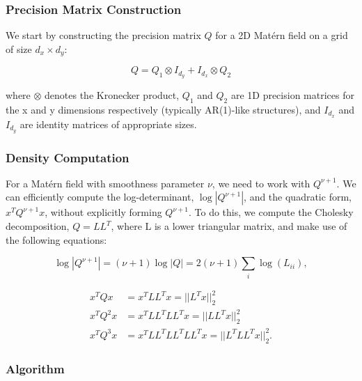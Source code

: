 \documentclass[
  12pt]{article}
\begin{document}
\subsubsection{Precision Matrix
Construction}\label{precision-matrix-construction}

We start by constructing the precision matrix \(Q\) for a 2D Matérn
field on a grid of size \(d_x \times d_y\):

\[
Q = Q_1 \otimes I_{d_y} + I_{d_x} \otimes Q_2 
\]

where \(\otimes\) denotes the Kronecker product, \(Q_1\) and \(Q_2\) are
1D precision matrices for the x and y dimensions respectively (typically
AR(1)-like structures), and \(I_{d_x}\) and \(I_{d_y}\) are identity
matrices of appropriate sizes.

\subsubsection{Density Computation}\label{density-computation}

For a Matérn field with smoothness parameter \(\nu\), we need to work
with \(Q^{\nu+1}\). We can efficiently compute the log-determinant,
\(\log|Q^{\nu+1}|\), and the quadratic form, \(x^T Q^{\nu+1} x\),
without explicitly forming \(Q^{\nu+1}\). To do this, we compute the
Cholesky decomposition, \(Q = LL^T\), where L is a lower triangular
matrix, and make use of the following equations:

\[
\log|Q^{\nu+1}| = (\nu+1)\log|Q| = 2(\nu+1)\sum_{i}\log(L_{ii}), 
\]

\[
\begin{aligned}
x^T Q x &= x^T L L^T x = ||L^T x||_2^2 \\
x^T Q^2 x &=  x^T L L^T L L^T x = ||LL^T x||_2^2 \\
x^T Q^3 x &=  x^T L L^T L L^T L L^T x = ||L^TLL^T x||_2^2.
\end{aligned}
\]

\subsubsection{Algorithm}\label{algorithm}
\end{document}
